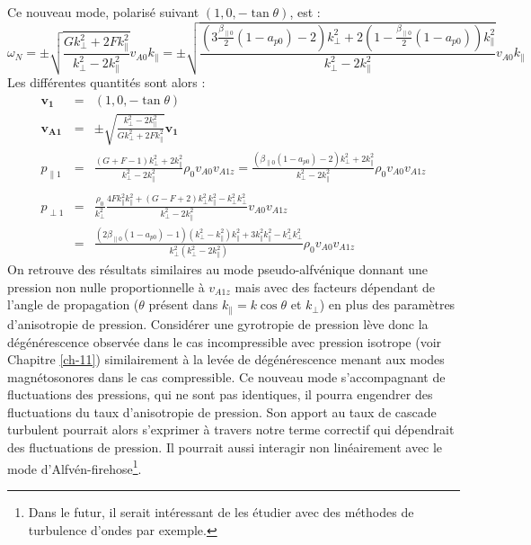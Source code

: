 Ce nouveau mode, polarisé suivant $(1,0,-\tan \theta)$, est : 
\begin{equation}
    \omega_N = \pm \sqrt{ \frac{G k^2_{\perp} + 2F k^2_{\parallel}}{k^2_{\perp}  - 2 k^2_{\parallel}}} v_{A0} k_{\parallel}= \pm \sqrt{ \frac{(3\frac{\beta_{\parallel 0}}{2} (1-a_{p0}) -2) k^2_{\perp} + 2( 1 - \frac{\beta_{\parallel 0}}{2} (1-a_{p0})) k^2_{\parallel}}{k^2_{\perp}  - 2 k^2_{\parallel}}} v_{A0} k_{\parallel} 
\end{equation} 
Les différentes quantités sont alors : 
\begin{eqnarray}
\boldsymbol{v_{1}} &=& (1,0,-\tan \theta)\\
  \boldsymbol{v_{A1}} &=&  \pm  \sqrt{ \frac{k^2_{\perp}  - 2 k^2_{\parallel}}{G k^2_{\perp} + 2F k^2_{\parallel}}} \boldsymbol{v_1} \\
   p_{\parallel 1} &=& \frac{(G + F - 1) k^2_{\perp}  + 2 k^2_{\parallel} }{k^2_{\perp}  - 2 k^2_{\parallel}}   \rho_0 v_{A0}v_{A1z} = \frac{(\beta_{\parallel 0} (1-a_{p0}) -2 ) k^2_{\perp}  + 2 k^2_{\parallel} }{k^2_{\perp}  - 2 k^2_{\parallel}}   \rho_0 v_{A0}v_{A1z} \nonumber\\ && \\
   p_{\perp 1} &=& \frac{\rho_0}{k^2_{\perp} }  \frac{4F k^2_{\parallel} k^2_{\parallel} +(G  - F + 2 )k^2_{\perp} k^2_{\parallel}- k^2_{\perp} k^2_{\perp}  }{k^2_{\perp}  - 2 k^2_{\parallel}} v_{A0}v_{A1z} \nonumber\\
   &=&    \frac{(2\beta_{\parallel 0} (1-a_{p0})  -  1   )(k^2_{\perp}  -  k^2_{\parallel}) k^2_{\parallel} + 3k^2_{\parallel}k^2_{\parallel} - k^2_{\perp} k^2_{\perp}  }{k^2_{\perp} (k^2_{\perp}  - 2 k^2_{\parallel})}\rho_0 v_{A0}v_{A1z} 
\end{eqnarray}
 On retrouve des résultats similaires au mode pseudo-alfvénique donnant une pression non nulle proportionnelle à $v_{A1z}$ mais avec des facteurs dépendant de l'angle de propagation ($\theta$ présent dans $k_{\parallel}=k \cos \theta$ et $k_{\perp}$) en plus des paramètres d'anisotropie de pression. Considérer une gyrotropie de pression lève donc la dégénérescence observée dans le cas incompressible avec pression isotrope (voir Chapitre \ref{ch-11}) similairement à la levée de dégénérescence menant aux modes magnétosonores dans le cas compressible. Ce nouveau mode s'accompagnant de fluctuations des pressions, qui ne sont pas identiques, il pourra engendrer des fluctuations du taux d'anisotropie de pression. Son apport au taux de cascade turbulent pourrait alors s'exprimer à travers notre terme correctif qui dépendrait des fluctuations de pression. Il pourrait aussi interagir non linéairement avec le mode d'Alfvén-firehose\footnote{Dans le futur, il serait intéressant de les étudier avec des méthodes de turbulence d'ondes par exemple.}. 
 
